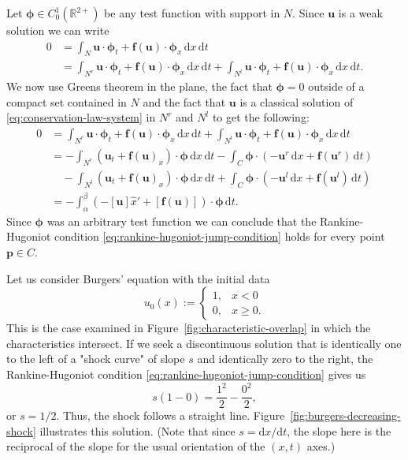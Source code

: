 \begin{Proof}
Let $\bm{\phi}\in C_0^1(\mathbb{R}^{2+})$ be any test function with support in $N$. Since $\bm{u}$ is a weak solution we can write
\[
\begin{aligned}
0&=\int_N\bm{u}\cdot\bm{\phi}_t+\bm{f}(\bm{u})\cdot\bm{\phi}_x\,\mathrm{d}x\,\mathrm{d}t\\
&=\int_{N^r}\bm{u}\cdot\bm{\phi}_t+\bm{f}(\bm{u})\cdot\bm{\phi}_x\,\mathrm{d}x\,\mathrm{d}t
+\int_{N^l}\bm{u}\cdot\bm{\phi}_t+\bm{f}(\bm{u})\cdot\bm{\phi}_x\,\mathrm{d}x\,\mathrm{d}t.
\end{aligned}
\]
We now use Green\textquotesingle s theorem in the plane, the fact that $\bm{\phi}=0$ outside of a compact set contained in $N$ and the fact that $\bm{u}$ is a classical solution of \eqref{eq:conservation-law-system} in $N^r$ and $N^l$ to get the following:
\[
\begin{aligned}
0&=\int_{N^r}\bm{u}\cdot\bm{\phi}_t+\bm{f}(\bm{u})\cdot\bm{\phi}_x\,\mathrm{d}x\,\mathrm{d}t
+\int_{N^l}\bm{u}\cdot\bm{\phi}_t+\bm{f}(\bm{u})\cdot\bm{\phi}_x\,\mathrm{d}x\,\mathrm{d}t\\
&=-\int_{N^r}(\bm{u}_t+\bm{f}(\bm{u})_x)\cdot\bm{\phi}\,\mathrm{d}x\,\mathrm{d}t
-\int_C\bm{\phi}\cdot(-\bm{u}^r\,\mathrm{d}x+\bm{f}(\bm{u}^r)\,\mathrm{d}t)\\
&\quad-\int_{N^l}(\bm{u}_t+\bm{f}(\bm{u})_x)\cdot\bm{\phi}\,\mathrm{d}x\,\mathrm{d}t
+\int_C\bm{\phi}\cdot(-\bm{u}^l\,\mathrm{d}x+\bm{f}(\bm{u}^l)\,\mathrm{d}t)\\
&=-\int_\alpha^\beta(-[\bm{u}]\hat x'+[\bm{f}(\bm{u})])\cdot\bm{\phi}\,\mathrm{d}t.
\end{aligned}
\]
Since $\bm{\phi}$ was an arbitrary test function we can conclude that the Rankine-Hugoniot condition \eqref{eq:rankine-hugoniot-jump-condition} holds for every point $\bm{p}\in C$.
\end{Proof}

\begin{Example}
\label{ex:burgers-decreasing-shock}
Let us consider Burgers' equation with the initial data
\begin{equation}\label{eq:burgers-decreasing-step-data}
u_0(x):=\begin{cases}1,&x<0\\0,&x\geq0.\end{cases}
\end{equation}
This is the case examined in Figure~\ref{fig:characteristic-overlap} in which the characteristics intersect. If we seek a discontinuous solution that is identically one to the left of a "shock curve" of slope $s$ and identically zero to the right, the Rankine-Hugoniot condition \eqref{eq:rankine-hugoniot-jump-condition} gives us
\begin{equation}\label{eq:burgers-decreasing-step-shock-speed}
s(1-0)=\dfrac{1^2}{2}-\dfrac{0^2}{2},
\end{equation}
or $s=1/2$. Thus, the shock follows a straight line. Figure~\ref{fig:burgers-decreasing-shock} illustrates this solution. (Note that since $s=\mathrm{d}x/\mathrm{d}t$, the slope here is the reciprocal of the slope for the usual orientation of the $(x,t)$ axes.)
\end{Example}

